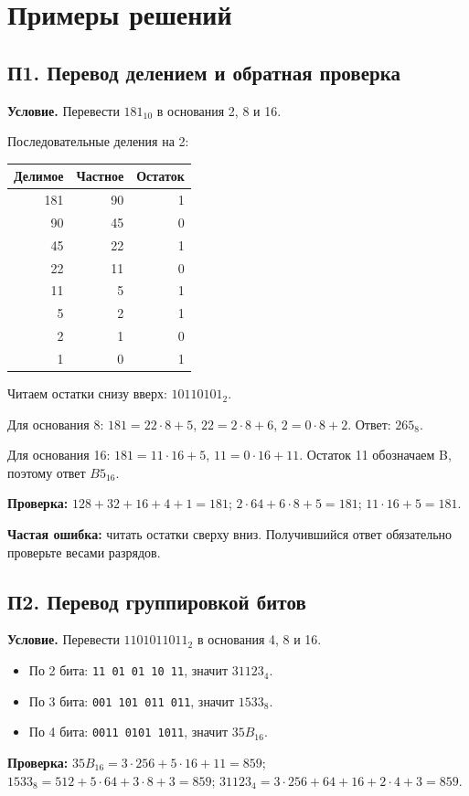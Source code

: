 \chapter{Примеры решений}

\section{П1. Перевод делением и обратная проверка}\label{ex:p1}
\textbf{Условие.} Перевести $181_{10}$ в основания 2, 8 и 16.

Последовательные деления на 2:
\begin{center}
\begin{tabular}{r|r|r}
Делимое & Частное & Остаток\\\hline
181 & 90 & 1\\90 & 45 & 0\\45 & 22 & 1\\22 & 11 & 0\\
11 & 5 & 1\\5 & 2 & 1\\2 & 1 & 0\\1 & 0 & 1
\end{tabular}
\end{center}
Читаем остатки снизу вверх: $10110101_2$.

Для основания 8: $181=22\cdot8+5$, $22=2\cdot8+6$, $2=0\cdot8+2$. Ответ: $265_8$.

Для основания 16: $181=11\cdot16+5$, $11=0\cdot16+11$. Остаток 11 обозначаем B, поэтому ответ $B5_{16}$.

\textbf{Проверка:} $128+32+16+4+1=181$; $2\cdot64+6\cdot8+5=181$; $11\cdot16+5=181$.

\textbf{Частая ошибка:} читать остатки сверху вниз. Получившийся ответ обязательно проверьте весами разрядов.

\section{П2. Перевод группировкой битов}\label{ex:p2}
\textbf{Условие.} Перевести $1101011011_2$ в основания 4, 8 и 16.
\begin{itemize}
    \item По 2 бита: \texttt{11 01 01 10 11}, значит $31123_4$.
    \item По 3 бита: \texttt{001 101 011 011}, значит $1533_8$.
    \item По 4 бита: \texttt{0011 0101 1011}, значит $35B_{16}$.
\end{itemize}
\textbf{Проверка:} $35B_{16}=3\cdot256+5\cdot16+11=859$;
$1533_8=512+5\cdot64+3\cdot8+3=859$;
$31123_4=3\cdot256+64+16+2\cdot4+3=859$.

